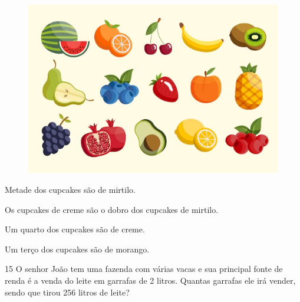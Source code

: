 \begin{figure}[htpb!]
\includegraphics[width=\textwidth]{./media/image150.png}
\end{figure}

\begin{escolha}
\item Metade dos cupcakes são de mirtilo.

\item Os cupcakes de creme são o dobro dos cupcakes de mirtilo.

\item Um quarto dos cupcakes são de creme.

\item Um terço dos cupcakes são de morango.
\end{escolha}


\num{15} O senhor João tem uma fazenda com várias vacas e sua principal fonte de renda é a venda do leite em garrafas de 2 litros. Quantas
garrafas ele irá vender, sendo que tirou 256 litros de leite?

